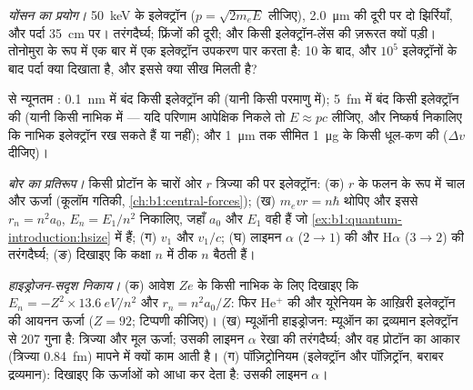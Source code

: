 \begin{exercise}[$\star\star$]\label{exo:b1:quantum-introduction:7}
\emph{योंसन का प्रयोग।} \qty{50}{keV} के इलेक्ट्रॉन ($p =
\sqrt{2m_eE}$ लीजिए), \qty{2.0}{\micro m} की दूरी पर दो झिर्रियाँ, और पर्दा
\qty{35}{cm} पर। तरंगदैर्घ्य; फ्रिंजों की दूरी; और किसी 
इलेक्ट्रॉन-लेंस की ज़रूरत क्यों पड़ी। तोनोमुरा के रूप में एक बार में एक
इलेक्ट्रॉन उपकरण पार करता है: 10 के बाद, और $10^5$ इलेक्ट्रॉनों के बाद पर्दा
क्या दिखाता है, और इससे क्या सीख मिलती है?
\end{exercise}

\begin{exercise}[$\star\star$]\label{exo:b1:quantum-introduction:8}
 से न्यूनतम : \qty{0.1}{nm} में बंद किसी
इलेक्ट्रॉन की (यानी किसी परमाणु में); \qty{5}{fm} में बंद किसी इलेक्ट्रॉन
की (यानी किसी नाभिक में --- यदि परिणाम आपेक्षिक निकले तो $E \approx pc$
लीजिए, और निष्कर्ष निकालिए कि नाभिक इलेक्ट्रॉन रख सकते हैं या नहीं); और
\qty{1}{\micro m} तक सीमित \qty{1}{\micro g} के किसी धूल-कण की ($\Delta v$ दीजिए)।
\end{exercise}

\begin{exercise}[$\star\star$]\label{exo:b1:quantum-introduction:9}
\emph{बोर का प्रतिरूप।} किसी प्रोटॉन के चारों ओर $r$ त्रिज्या की  पर इलेक्ट्रॉन: (क) $r$ के फलन के रूप में चाल और ऊर्जा (कूलॉम गतिकी,
\cref{ch:b1:central-forces}); (ख) $m_evr = n\hbar$ थोपिए और इससे
$r_n = n^2a_0$, $E_n = E_1/n^2$ निकालिए, जहाँ $a_0$ और $E_1$ वही हैं जो
\cref{ex:b1:quantum-introduction:hsize} में हैं; (ग) $v_1$ और $v_1/c$; (घ)
लाइमन $\alpha$ ($2 \to 1$) की और H$\alpha$ ($3 \to 2$) की तरंगदैर्घ्य;
(ङ) दिखाइए कि कक्षा $n$ में ठीक $n$  बैठती हैं।
\end{exercise}

\begin{exercise}[$\star\star\star$]\label{exo:b1:quantum-introduction:10}
\emph{हाइड्रोजन-सदृश निकाय।} (क) आवेश $Ze$ के किसी नाभिक के लिए दिखाइए कि
$E_n = -Z^2 \times \qty{13.6}{eV}/n^2$ और $r_n = n^2a_0/Z$: फिर He$^+$ की और
यूरेनियम के आख़िरी इलेक्ट्रॉन की आयनन ऊर्जा ($Z = 92$; टिप्पणी कीजिए)।
(ख) म्यूऑनी हाइड्रोजन: म्यूऑन का द्रव्यमान इलेक्ट्रॉन से $207$ गुना है:
त्रिज्या और मूल ऊर्जा; उसकी लाइमन $\alpha$ रेखा की तरंगदैर्घ्य; और वह
प्रोटॉन का आकार (त्रिज्या \qty{0.84}{fm}) मापने में क्यों काम आती है।
(ग) पॉज़िट्रोनियम (इलेक्ट्रॉन और पॉज़िट्रॉन, बराबर द्रव्यमान): दिखाइए कि
 ऊर्जाओं को आधा कर देता है: उसकी लाइमन $\alpha$।
\end{exercise}


